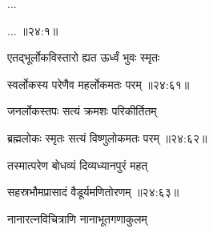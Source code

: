 \centerline{\Large\devanagarifont [   चतुर्विंशतिमो ऽध्यायः  ]}{\vrule depth10pt width0pt} 
\vers


{\devanagarifont ... \thinspace{\dandab} \dontdisplaylinenum  }%
 

{\devanagarifont ...  {॥२४:१॥} \veg\dontdisplaylinenum }%

\vers


{\devanagarifont एतद्भूर्लोकविस्तारो ह्यत ऊर्ध्वं भुवः स्मृतः \thinspace{\dandab} \dontdisplaylinenum }%


{\devanagarifont स्वर्लोकस्य परेणैव महर्लोकमतः परम् {॥२४:६१॥} \veg\dontdisplaylinenum }%

{\devanagarifont जनर्लोकस्तपः सत्यं क्रमशः परिकीर्तितम् \thinspace{\dandab} \dontdisplaylinenum }%


{\devanagarifont ब्रह्मलोकः स्मृतः सत्यं विष्णुलोकमतः परम् {॥२४:६२॥} \veg\dontdisplaylinenum }%


 
{\devanagarifont तस्मात्परेण बोधव्यं दिव्यध्यानपुरं महत् \thinspace{\dandab} \dontdisplaylinenum }%


{\devanagarifont सहस्रभौमप्रासादं वैडूर्यमणितोरणम् {॥२४:६३॥} \veg\dontdisplaylinenum }%

{\devanagarifont नानारत्नविचित्राणि नानाभूतगणाकुलम् \thinspace{\dandab} \dontdisplaylinenum }%
 

